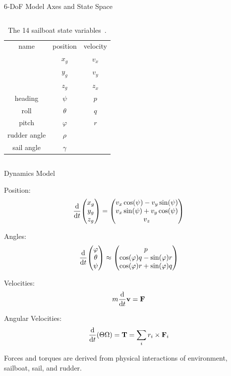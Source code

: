 \documentclass[10pt,xcolor={table,dvipsnames},t]{beamer}
\begin{document}
\begin{frame}{6-DoF Model Axes and State Space}
\begin{columns}
\begin{table}
    \centering
    \begin{tabular}{ccc}
    name & position & velocity \\
     &\(x_g\) & \(v_x\) \\
     &\(y_g\) & \(v_y\) \\
     &\(z_g\) & \(z_x\) \\
     heading&\(\psi\) & \(p\) \\
     \textcolor{officeblue}{roll} & \textcolor{officeblue}{\(\theta\)} & \textcolor{officeblue}{\(q\)} \\
     \textcolor{officeblue}{pitch}&\textcolor{officeblue}{\(\varphi\)} & \textcolor{officeblue}{\(r\)} \\
     \textcolor{officeblue}{rudder angle} & \textcolor{officeblue}{\(\rho\)} & \\
     \textcolor{officeblue}{sail angle}   & \textcolor{officeblue}{\(\gamma\)} & 
    \end{tabular}
    \caption{The 14 sailboat state variables~\cite{Buehler2018}.}
    \label{tab:state_vars}
\end{table}


\end{columns}

    
\end{frame}

\begin{frame}{Dynamics Model}

Position:
\begin{equation}
    \dv{t} \mqty(x_g \\ y_g \\ z_g) = \mqty(v_x \cos(\psi) - v_y \sin(\psi) \\ v_x \sin(\psi) + v_y \cos(\psi) \\ v_z)
\end{equation}

Angles:
\begin{equation}
    \dv{t} \mqty(\varphi \\ \theta \\ \psi) \approx \mqty(p \\ \cos(\varphi) q - \sin(\varphi) r \\ \cos(\varphi) r + \sin(\varphi) q)
\end{equation}

Velocities:
\begin{equation}
    m\dv{t}\mathbf{v} = \mathbf{F}
\end{equation}

Angular Velocities:
\begin{equation}
    \dv{t}(\Theta\Omega) = \mathbf{T} = \sum_i r_i \times \mathbf{F}_i
\end{equation}

Forces and torques are derived from physical interactions of environment, sailboat, sail, and rudder.
\end{frame}
\end{document}
